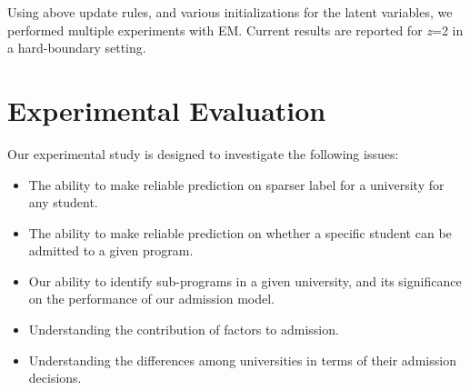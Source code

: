 \documentclass{sig-alternate-05-2015}
\begin{document}
Using above update rules, and various initializations for the latent variables, we performed multiple experiments with EM. Current results are reported for \textit{z}=2 in a hard-boundary setting.


\section{Experimental Evaluation}
\label{sec:experiments}
Our experimental study is designed to investigate the following issues:
\begin{itemize}
\item The ability to make reliable prediction on sparser label for a university for any student.
\item The ability to make reliable prediction on whether a specific student can be admitted to a given program.
\item Our ability to identify sub-programs in a given university, and its significance on the performance of our admission model.
\item Understanding the contribution of factors to admission.
\item Understanding the differences among universities in terms of their admission decisions.
\end{itemize}
\end{document}
